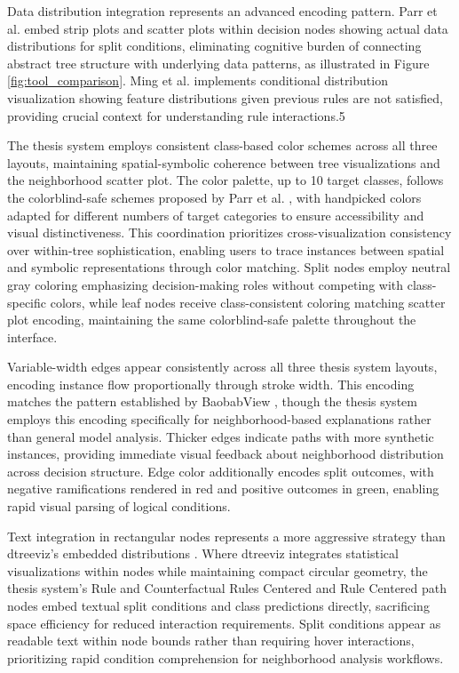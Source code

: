 Data distribution integration represents an advanced encoding pattern. Parr et al. \cite{parr2019dtreeviz} embed strip plots and scatter plots within decision nodes showing actual data distributions for split conditions, eliminating cognitive burden of connecting abstract tree structure with underlying data patterns, as illustrated in Figure \ref{fig:tool_comparison}. Ming et al. \cite{ming2019rulematrix} implements conditional distribution visualization showing feature distributions given previous rules are not satisfied, providing crucial context for understanding rule interactions.5

The thesis system employs consistent class-based color schemes across all three layouts, maintaining spatial-symbolic coherence between tree visualizations and the neighborhood scatter plot. The color palette, up to 10 target classes, follows the colorblind-safe schemes proposed by Parr et al. \cite{parr2019dtreeviz}, with handpicked colors adapted for different numbers of target categories to ensure accessibility and visual distinctiveness. This coordination prioritizes cross-visualization consistency over within-tree sophistication, enabling users to trace instances between spatial and symbolic representations through color matching. Split nodes employ neutral gray coloring emphasizing decision-making roles without competing with class-specific colors, while leaf nodes receive class-consistent coloring matching scatter plot encoding, maintaining the same colorblind-safe palette throughout the interface.

Variable-width edges appear consistently across all three thesis system layouts, encoding instance flow proportionally through stroke width. This encoding matches the pattern established by BaobabView \cite{elzen2011baobabview}, though the thesis system employs this encoding specifically for neighborhood-based explanations rather than general model analysis. Thicker edges indicate paths with more synthetic instances, providing immediate visual feedback about neighborhood distribution across decision structure. Edge color additionally encodes split outcomes, with negative ramifications rendered in red and positive outcomes in green, enabling rapid visual parsing of logical conditions.

Text integration in rectangular nodes represents a more aggressive strategy than dtreeviz's embedded distributions \cite{parr2019dtreeviz}. Where dtreeviz integrates statistical visualizations within nodes while maintaining compact circular geometry, the thesis system's Rule and Counterfactual Rules Centered and Rule Centered path nodes embed textual split conditions and class predictions directly, sacrificing space efficiency for reduced interaction requirements. Split conditions appear as readable text within node bounds rather than requiring hover interactions, prioritizing rapid condition comprehension for neighborhood analysis workflows.

